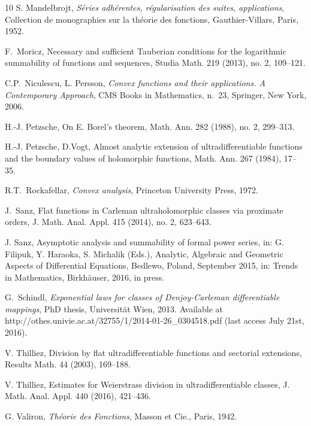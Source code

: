 \documentclass[11pt,a4paper]{article}
\theoremstyle{definition}
\begin{document}
\begin{thebibliography}{10}
 S. Mandelbrojt,
\emph{S\'eries adh\'erentes, r\'egularisation des suites, applications}, Collection de monographies
sur la th\'eorie des fonctions, Gauthier-Villars, Paris, 1952.





 F.~Moricz, Necessary and sufficient Tauberian conditions for the logarithmic summability
of functions and sequences, Studia Math. 219 (2013), no. 2, 109--121.

C.P.~Niculescu, L. Persson,
{\em Convex functions and their applications. A Contemporary Approach},
 CMS Books in Mathematics, n.\ 23, Springer, New York, 2006.

 H.-J. Petzsche, On E. Borel's theorem, Math. Ann. 282 (1988), no. 2, 299--313.

  H.-J. Petzsche, D.Vogt, Almost analytic extension of ultradifferentiable
functions and the boundary values of holomorphic functions, Math. Ann.  267 (1984), 17--35.



 R.T.~Rockafellar, {\em Convex analysis}, Princeton University Press, 1972.



 J.~Sanz, Flat functions in Carleman ultraholomorphic classes
via proximate orders, J. Math. Anal. Appl. 415 (2014), no. 2, 623--643.

 J. Sanz, Asymptotic analysis and summability of formal power series, in: G. Filipuk, Y. Haraoka, S. Michalik (Eds.), Analytic, Algebraic and Geometric Aspects of Differential Equations, Bedlewo, Poland, September 2015, in: Trends in Mathematics, Birkh\"auser, 2016, in press.

 G.~Schindl,
{\em Exponential laws for classes of Denjoy-Carleman differentiable mappings}, PhD thesis, Universit\"at Wien, 2013. Available at http://othes.univie.ac.at/32755/1/2014-01-26\_0304518.pdf (last access July 21st, 2016).

 V. Thilliez, Division by flat ultradifferentiable functions and sectorial extensions, Results Math. 44 (2003), 169--188.

 V. Thilliez, Estimates for Weierstrass division in ultradifferentiable classes,
J. Math. Anal. Appl. 440 (2016), 421--436.

 G. Valiron, \emph{Th\'eorie des Fonctions}, Masson et Cie., Paris, 1942.
\end{thebibliography}
\end{document}
